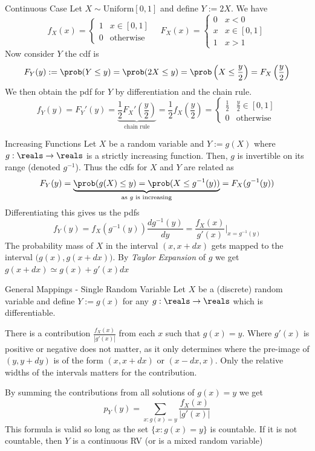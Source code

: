 \documentclass[11pt,a4paper]{article}
\begin{document}
  \begin{example}{Continuous Case}
    Let $X\sim\text{Uniform}[0,1]$ and define $Y:=2X$. We have
    \[ f_X(x)=\begin{cases}1&x\in[0,1]\\0&\text{otherwise}\end{cases}\quad F_X(x)=\begin{cases}0&x<0\\x&x\in[0,1]\\1&x>1\end{cases} \]
    Now consider $Y$ the cdf is
    \[ F_Y(y):=\prob(Y\leq y)=\prob(2X\leq y)=\prob\left(X\leq\frac{y}2\right)=F_X\left(\frac{y}2\right) \]
    We then obtain the pdf for $Y$ by differentiation and the chain rule.
    \[f_Y(y)=F_Y'(y)=\underbrace{\frac12F_X'\left(\frac{y}2\right)}_\text{chain rule}=\frac12f_X\left(\frac{y}2\right)=\begin{cases}\frac12&\frac{y}2\in[0,1]\\0&\text{otherwise}\end{cases}  \]
  \end{example}

  \begin{proposition}{Increasing Functions}
    Let $X$ be a random variable and $Y:=g(X)$ where $g:\reals\to\reals$ is a strictly increasing function. Then, $g$ is invertible on its range (denoted $g^{-1}$). Thus the cdfs for $X$ and $Y$ are related as
    \[ F_Y(y)=\underbrace{\prob(g(X)\leq y)=\prob(X\leq g^{-1}(y))}_\text{as $g$ is increasing}=F_X(g^{-1}(y)) \]
    Differentiating this gives us the pdfs
    \[ f_Y(y)=f_X\left(g^{-1}(y)\right)\frac{dg^{-1}(y)}{dy}=\frac{f_X(x)}{g'(x)}\bigg|_{x=g^{-1}(y)} \]
    The probability mass of $X$ in the interval $(x,x+dx)$ gets mapped to the interval $\big(g(x),g(x+dx)\big)$. By \textit{Taylor Expansion} of $g$ we get $g(x+dx)\simeq g(x)+g'(x)dx$
  \end{proposition}

  \begin{proposition}{General Mappings - Single Random Variable}
    Let $X$ be a (discrete) random variable and define $Y:=g(x)$ for any $g:\reals\to\reals$ which is differentiable.
    \par There is a contribution $\frac{f_X(x)}{|g'(x)|}$ from each $x$ such that $g(x)=y$. Where $g'(x)$ is positive or negative does not matter, as it only determines where the pre-image of $(y,y+dy)$ is of the form $(x,x+dx)$ or $(x-dx,x)$. Only the relative widths of the intervals matters for the contribution.
    \par By summing the contributions from all solutions of $g(x)=y$ we get
    \[ p_Y(y)=\sum_{x:g(x)=y}\frac{f_X(x)}{|g'(x)|} \]
    This formula is valid so long as the set $\{x:g(x)=y\}$ is countable. If it is not countable, then $Y$ is a continuous RV (or is a mixed random variable)
  \end{proposition}
\end{document}
